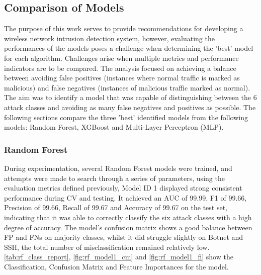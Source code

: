 \subsection{Comparison of Models}

The purpose of this work serves to provide recommendations for developing a wireless network intrusion detection system, however, evaluating the performances of the models poses a challenge when determining the 'best' model for each algorithm. Challenges arise when multiple metrics and performance indicators are to be compared. The analysis focused on achieving a balance between avoiding false positives (instances where normal traffic is marked as malicious) and false negatives (instances of malicious traffic marked as normal). The aim was to identify a model that was capable of distinguishing between the 6 attack classes and avoiding as many false negatives and positives as possible. The following sections compare the three 'best' identified models from the following models: Random Forest, XGBoost and Multi-Layer Perceptron (MLP).

\subsubsection*{Random Forest}

During experimentation, several Random Forest models were trained, and attempts were made to search through a series of parameters, using the evaluation metrics defined previously, Model ID 1 displayed strong consistent performance during CV and testing. It achieved an AUC of 99.99, F1 of 99.66, Precision of 99.66, Recall of 99.67 and Accuracy of 99.67 on the test set, indicating that it was able to correctly classify the six attack classes with a high degree of accuracy. The model's confusion matrix shows a good balance between FP and FNs on majority classes, whilst it did struggle slightly on Botnet and SSH, the total number of misclassification remained relatively low. \ref{tab:rf_class_report}, \ref{fig:rf_model1_cm} and \ref{fig:rf_model1_fi} show the Classification, Confusion Matrix and Feature Importances for the model.

